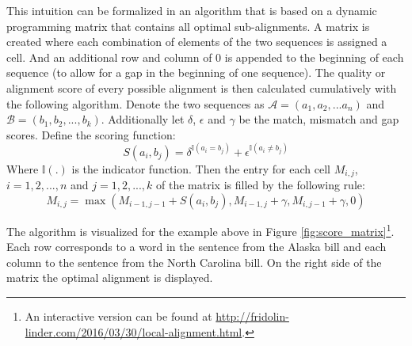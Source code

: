 \documentclass[12pt]{article} %
\begin{document}
This intuition can be formalized in an algorithm that is based on a dynamic programming matrix that contains all optimal sub-alignments. A matrix is created where each combination of elements of the two sequences is assigned a cell. And an additional row and column of 0 is appended to the beginning of each sequence (to allow for a gap in the beginning of one sequence). The quality or alignment score of every possible alignment is then calculated cumulatively with the following algorithm. Denote the two sequences as $\mathcal{A} = (a_1, a_2, ... a_n)$ and $\mathcal{B} = (b_1, b_2, ..., b_k)$. Additionally let $\delta$, $\epsilon$ and $\gamma$ be the match, mismatch and gap scores. Define the scoring function:
\begin{equation}
	\label{eqn:scoring}
	S(a_i, b_j) = \delta^{\mathbb{I}(a_i = b_j)} + \epsilon^{\mathbb{I}(a_i \neq b_j)}
\end{equation} 
Where $\mathbb{I}(.)$ is the indicator function. Then the entry for each cell $M_{i,j}$, $i=1,2,...,n$ and $j=1,2,...,k$ of the matrix is filled by the following rule:
\begin{equation}
	\label{eqn:fill}
	M_{i,j} = \max(M_{i-1,j-1} + S(a_i, b_j), M_{i-1,j} + \gamma, M_{i,j-1} + \gamma, 0)
\end{equation}

The algorithm is visualized for the example above in Figure
\ref{fig:score_matrix}\footnote{An interactive version can be found at
    \url{http://fridolin-linder.com/2016/03/30/local-alignment.html}.}. Each row corresponds to a word in the sentence from the Alaska bill and each column to the sentence from the North Carolina bill. On the right side of the matrix the optimal alignment is displayed.
\end{document}
